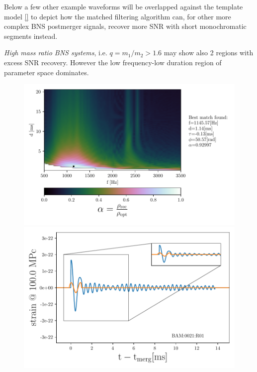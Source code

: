 \FloatBarrier


Below a few other example waveforms will be overlapped against the template model \ref{} to depict how the matched filtering algorithm can, for other more complex BNS postmerger signals, recover more SNR with short monochromatic segments instead.
 

\textit{High mass ratio BNS systems}, i.e. $q=m_1/m_2>1.6$ may show also 2 regions with excess SNR recovery. However the low frequency-low duration region of parameter space dominates.

\begin{figure}[!htbp]
\begin{center}
\begin{minipage}[t]{0.5\linewidth}
\vspace{0pt}
\includegraphics[scale=0.6,trim={2mm 0 35mm 0},clip]{images/Data_analysis/results/2D_grid_3.pdf}
\end{minipage}%
\begin{minipage}[t]{0.5\linewidth}
\vspace{20pt}
\includegraphics[scale=0.45]{images/Data_analysis/results/2D_grid_4.pdf}

\end{minipage}
\end{center}
\end{figure}
